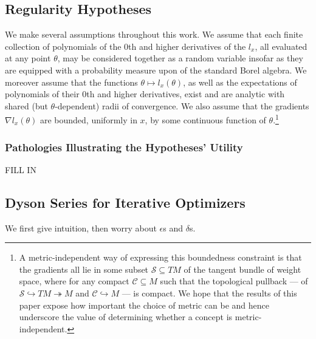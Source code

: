 \documentclass{article}
\newcommand{\Cc}{\mathcal{C}}
\newcommand{\Ss}{\mathcal{S}}
\begin{document}
    \subsection*{Regularity Hypotheses}
        We make several assumptions throughout this work.
        We assume that each finite collection of polynomials of the $0$th and
        higher derivatives of the $l_x$, all evaluated at any point $\theta$,
        may be considered together as a random variable insofar as they are
        equipped with a probability measure upon of the standard Borel algebra.
        We moreover assume that the functions $\theta \mapsto l_x(\theta)$, as
        well as the expectations of polynomials of their $0$th and higher
        derivatives, exist and are analytic with shared (but
        $\theta$-dependent) radii of convergence.  We also assume that the
        gradients $\nabla l_x(\theta)$ are bounded, uniformly in $x$, by some
        continuous function of $\theta$.\footnote{
            A metric-independent way of
            expressing this boundedness constraint is that the gradients all lie
            in some subset $\Ss \subseteq TM$ of the tangent bundle of weight
            space, where for any compact $\Cc \subseteq M$ such that the
            topological pullback --- of
            $\Ss \hookrightarrow TM \twoheadrightarrow M$
            and
            $\Cc \hookrightarrow M$ ---
            is compact.
            We hope that the results of this paper expose how important the
            choice of metric can be and hence underscore the value of
            determining  whether a concept is metric-independent.
        }

        \subsubsection*{Pathologies Illustrating the Hypotheses' Utility}
            {\color{moor} FILL IN}


    \subsection*{Dyson Series for Iterative Optimizers}
        We first give intuition, then worry about $\epsilon$s and $\delta$s.
\end{document}
